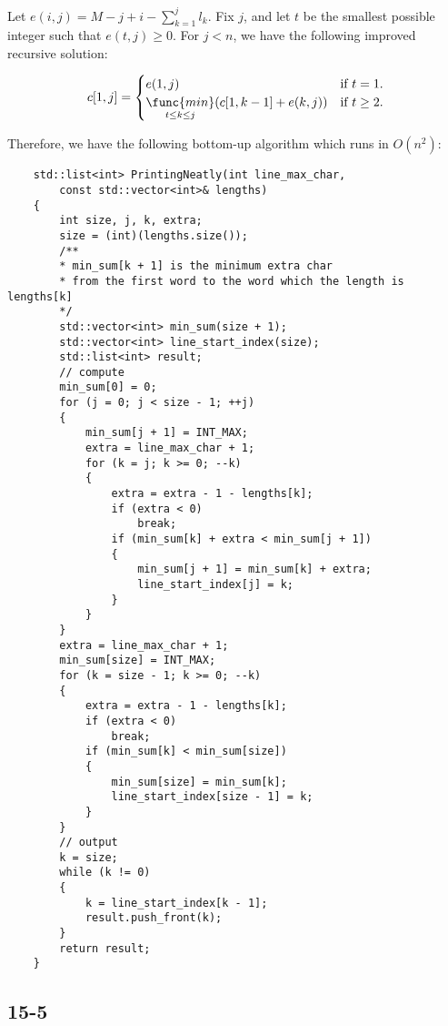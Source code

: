 \noindent
Let $e(i,j) = M - j + i - \sum\limits_{k=1}^j l_k$.
Fix $j$, and let $t$ be the smallest possible integer such that
$e(t,j) \geq 0$.
For $j < n$, we have the following improved recursive solution:

\begin{equation*}
    c[1,j] = 
    \begin{cases}
        e(1,j) & \text{if $t = 1$.} \\
        \mathop{\func{min}}\limits_{t \leq k \leq j}
            (c[1,k-1] + e(k, j)) & \text{if $t \geq 2$.}
    \end{cases}
\end{equation*}

\noindent
Therefore, we have the following bottom-up algorithm which runs in $O(n^2)$:

\begin{verbatim}
    std::list<int> PrintingNeatly(int line_max_char, 
        const std::vector<int>& lengths)
    {
        int size, j, k, extra;
        size = (int)(lengths.size());
        /**
        * min_sum[k + 1] is the minimum extra char
        * from the first word to the word which the length is lengths[k]
        */
        std::vector<int> min_sum(size + 1);
        std::vector<int> line_start_index(size);
        std::list<int> result;
        // compute
        min_sum[0] = 0;
        for (j = 0; j < size - 1; ++j)
        {
            min_sum[j + 1] = INT_MAX;
            extra = line_max_char + 1;
            for (k = j; k >= 0; --k)
            {
                extra = extra - 1 - lengths[k];
                if (extra < 0)
                    break;
                if (min_sum[k] + extra < min_sum[j + 1])
                {
                    min_sum[j + 1] = min_sum[k] + extra;
                    line_start_index[j] = k;
                }
            }
        }
        extra = line_max_char + 1;
        min_sum[size] = INT_MAX;
        for (k = size - 1; k >= 0; --k)
        {
            extra = extra - 1 - lengths[k];
            if (extra < 0)
                break;
            if (min_sum[k] < min_sum[size])
            {
                min_sum[size] = min_sum[k];
                line_start_index[size - 1] = k;
            }
        }
        // output
        k = size;
        while (k != 0)
        {
            k = line_start_index[k - 1];
            result.push_front(k);
        }
        return result;
    }
\end{verbatim}

\subsection*{15-5}

